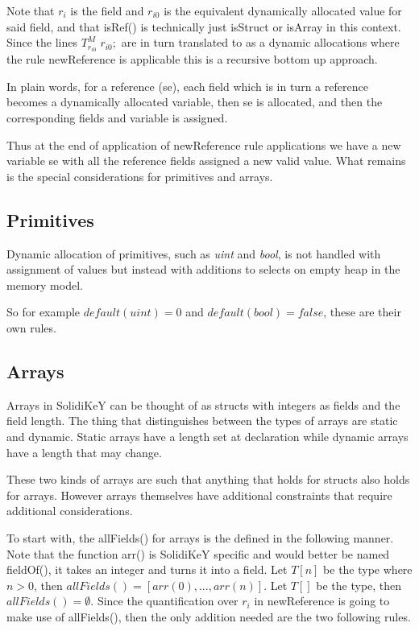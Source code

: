 \documentclass{article}
\begin{document}
	Note that $r_i$ is the field and $r_{i0}$ is the equivalent dynamically allocated value for said field, and that isRef() is technically just isStruct or isArray in this context. Since the lines $T^M_{r_{i0}}\; r_{i0};$ are in turn translated to as a dynamic allocations where the rule newReference is applicable this is a recursive bottom up approach.
	
	In plain words, for a reference (se), each field which is in turn a reference becomes a dynamically allocated variable, then se is allocated, and then the corresponding fields and variable is assigned. 
	
	Thus at the end of application of newReference rule applications we have a new variable se with all the reference fields assigned a new valid value. What remains is the special considerations for primitives and arrays. 
	
	\subsection{Primitives} \label{dynAllocPrim}
	Dynamic allocation of primitives, such as \textit{uint} and \textit{bool}, is not handled with assignment of values but instead with additions to selects on empty heap in the memory model. 
	
	\begin{prooftree}
	\end{prooftree}
	
	So for example $default(uint) = 0$ and $default(bool) = false$, these are their own rules.  
	
	\subsection{Arrays} \label{array}
	Arrays in SolidiKeY can be thought of as structs with integers as fields and the field length. The thing that distinguishes between the types of arrays are static and dynamic. Static arrays have a length set at declaration while dynamic arrays have a length that may change. 
	
	These two kinds of arrays are such that anything that holds for structs also holds for arrays. However arrays themselves have additional constraints that require additional considerations. 
	
	To start with, the allFields() for arrays is the defined in the following manner. Note that the function arr() is SolidiKeY specific and would better be named fieldOf(), it takes an integer and turns it into a field. Let $T[n]$ be the type where $n>0$, then $allFields() = [arr(0),...,arr(n)]$. Let $T[]$ be the type, then $allFields() = \emptyset$. Since the quantification over $r_i$ in newReference is going to make use of allFields(), then the only addition needed are the two following rules. 
	
\end{document}
